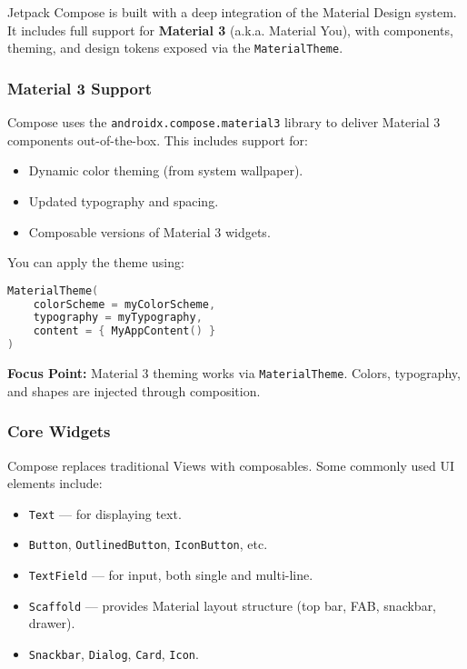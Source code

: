 \documentclass[a4paper,12pt]{article}
\begin{document}
Jetpack Compose is built with a deep integration of the Material Design system. It includes full support for \textbf{Material 3} (a.k.a. Material You), with components, theming, and design tokens exposed via the \texttt{MaterialTheme}.

\subsubsection{Material 3 Support}

Compose uses the \texttt{androidx.compose.material3} library to deliver Material 3 components out-of-the-box. This includes support for:

\begin{itemize}
  \item Dynamic color theming (from system wallpaper).
  \item Updated typography and spacing.
  \item Composable versions of Material 3 widgets.
\end{itemize}

You can apply the theme using:

\begin{lstlisting}[language=Kotlin]
MaterialTheme(
    colorScheme = myColorScheme,
    typography = myTypography,
    content = { MyAppContent() }
)
\end{lstlisting}

\textbf{Focus Point:} Material 3 theming works via \texttt{MaterialTheme}. Colors, typography, and shapes are injected through composition.

\subsubsection{Core Widgets}

Compose replaces traditional Views with composables. Some commonly used UI elements include:

\begin{itemize}
  \item \texttt{Text} — for displaying text.
  \item \texttt{Button}, \texttt{OutlinedButton}, \texttt{IconButton}, etc.
  \item \texttt{TextField} — for input, both single and multi-line.
  \item \texttt{Scaffold} — provides Material layout structure (top bar, FAB, snackbar, drawer).
  \item \texttt{Snackbar}, \texttt{Dialog}, \texttt{Card}, \texttt{Icon}.
\end{itemize}
\end{document}
